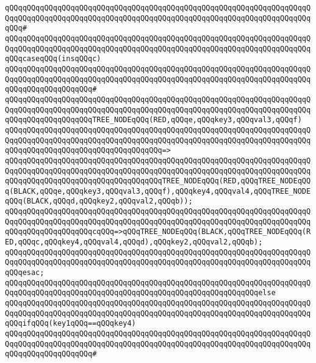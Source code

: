 \verb|qQQqqQQqqQQqqQQqqQQqqQQqqQQqqQQqqQQqqQQqqQQqqQQqqQQqqQQqqQQqqQQqqQQqqQQqqQQqqQQqqQQqqQQqqQQqqQQqqQQqqQQqqQQqqQQqqQQqqQQqqQQqqQQqqQQqqQQqqQQqqQQq#|\newline
\verb|qQQqqQQqqQQqqQQqqQQqqQQqqQQqqQQqqQQqqQQqqQQqqQQqqQQqqQQqqQQqqQQqqQQqqQQqqQQqqQQqqQQqqQQqqQQqqQQqqQQqqQQqqQQqqQQqqQQqqQQqqQQqqQQqqQQqqQQqqQQqqQQqcaseqQQq(insqQQqc)|\newline
\verb|qQQqqQQqqQQqqQQqqQQqqQQqqQQqqQQqqQQqqQQqqQQqqQQqqQQqqQQqqQQqqQQqqQQqqQQqqQQqqQQqqQQqqQQqqQQqqQQqqQQqqQQqqQQqqQQqqQQqqQQqqQQqqQQqqQQqqQQqqQQqqQQqqQQqqQQqqQQqqQQq#|\newline
\verb|qQQqqQQqqQQqqQQqqQQqqQQqqQQqqQQqqQQqqQQqqQQqqQQqqQQqqQQqqQQqqQQqqQQqqQQqqQQqqQQqqQQqqQQqqQQqqQQqqQQqqQQqqQQqqQQqqQQqqQQqqQQqqQQqqQQqqQQqqQQqqQQqqQQqqQQqqQQqqQQqTREE_NODEqQQq(RED,qQQqe,qQQqkey3,qQQqval3,qQQqf)|\newline
\verb|qQQqqQQqqQQqqQQqqQQqqQQqqQQqqQQqqQQqqQQqqQQqqQQqqQQqqQQqqQQqqQQqqQQqqQQqqQQqqQQqqQQqqQQqqQQqqQQqqQQqqQQqqQQqqQQqqQQqqQQqqQQqqQQqqQQqqQQqqQQqqQQqqQQqqQQqqQQqqQQqqQQqqQQqqQQqqQQq=>|\newline
\verb|qQQqqQQqqQQqqQQqqQQqqQQqqQQqqQQqqQQqqQQqqQQqqQQqqQQqqQQqqQQqqQQqqQQqqQQqqQQqqQQqqQQqqQQqqQQqqQQqqQQqqQQqqQQqqQQqqQQqqQQqqQQqqQQqqQQqqQQqqQQqqQQqqQQqqQQqqQQqqQQqqQQqqQQqqQQqqQQqTREE_NODEqQQq(RED,qQQqTREE_NODEqQQq(BLACK,qQQqe,qQQqkey3,qQQqval3,qQQqf),qQQqkey4,qQQqval4,qQQqTREE_NODEqQQq(BLACK,qQQqd,qQQqkey2,qQQqval2,qQQqb));|\newline
\newline
\verb|qQQqqQQqqQQqqQQqqQQqqQQqqQQqqQQqqQQqqQQqqQQqqQQqqQQqqQQqqQQqqQQqqQQqqQQqqQQqqQQqqQQqqQQqqQQqqQQqqQQqqQQqqQQqqQQqqQQqqQQqqQQqqQQqqQQqqQQqqQQqqQQqqQQqqQQqqQQqqQQqcqQQq=>qQQqTREE_NODEqQQq(BLACK,qQQqTREE_NODEqQQq(RED,qQQqc,qQQqkey4,qQQqval4,qQQqd),qQQqkey2,qQQqval2,qQQqb);|\newline
\verb|qQQqqQQqqQQqqQQqqQQqqQQqqQQqqQQqqQQqqQQqqQQqqQQqqQQqqQQqqQQqqQQqqQQqqQQqqQQqqQQqqQQqqQQqqQQqqQQqqQQqqQQqqQQqqQQqqQQqqQQqqQQqqQQqqQQqqQQqqQQqqQQqesac;|\newline
\newline
\verb|qQQqqQQqqQQqqQQqqQQqqQQqqQQqqQQqqQQqqQQqqQQqqQQqqQQqqQQqqQQqqQQqqQQqqQQqqQQqqQQqqQQqqQQqqQQqqQQqqQQqqQQqqQQqqQQqqQQqqQQqqQQqqQQqelse|\newline
\verb|qQQqqQQqqQQqqQQqqQQqqQQqqQQqqQQqqQQqqQQqqQQqqQQqqQQqqQQqqQQqqQQqqQQqqQQqqQQqqQQqqQQqqQQqqQQqqQQqqQQqqQQqqQQqqQQqqQQqqQQqqQQqqQQqqQQqqQQqqQQqqQQqifqQQq(key1qQQq==qQQqkey4)|\newline
\verb|qQQqqQQqqQQqqQQqqQQqqQQqqQQqqQQqqQQqqQQqqQQqqQQqqQQqqQQqqQQqqQQqqQQqqQQqqQQqqQQqqQQqqQQqqQQqqQQqqQQqqQQqqQQqqQQqqQQqqQQqqQQqqQQqqQQqqQQqqQQqqQQqqQQqqQQqqQQqqQQq#|\newline
